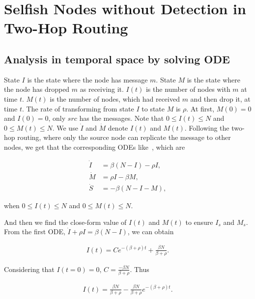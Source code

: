 \section{Selfish Nodes without Detection in Two-Hop Routing}
\label{sec:wo_detect}
\subsection{Analysis in temporal space by solving ODE}
State $I$ is the state where the node has message $m$.
State $M$ is the state where the node has dropped $m$ as receiving it.
$I(t)$ is the number of nodes with $m$ at time $t$.
$M(t)$ is the number of nodes, which had received $m$ and then drop it, at time $t$.
The rate of transforming from state $I$ to state $M$ is $\rho$.
At first, $M(0)=0$ and $I(0)=0$, only $src$ has the messages.
Note that $0 \le I(t) \le N$ and $0 \le M(t) \le N$.
We use $\dot{I}$ and $\dot{M}$ denote $I(t)$ and $M(t)$.
Following the two-hop routing,
where only the source node can replicate the message to other nodes,
we get that the corresponding ODEs like~\cite{CC2007PerfAnaly}, which are
\begin{small}
\begin{equation}
\nonumber
\begin{aligned}
\dot{I} &= \beta (N-I) - \rho I,\\
\dot{M} &= \rho I - \beta M,\\
\dot{S} &= - \beta (N-I-M),
\end{aligned}
\end{equation}
\end{small}
when $0 \le I(t) \le N$ and $0 \le M(t) \le N$.

And then we find the close-form value of $I(t)$ and $M(t)$ to ensure $I_{s}$ and $M_{s}$.
From the first ODE, $\dot{I} + \rho I = \beta (N-I)$, we can obtain
\begin{small}
\begin{equation}
\nonumber
\begin{aligned}
I(t) = C e^{-(\beta + \rho)t} + \frac{ \beta N }{ \beta + \rho }.
\end{aligned}
\end{equation}
\end{small}
Considering that $I(t=0) = 0$, $C = \frac{ -\beta N }{ \beta + \rho }$.
Thus
\begin{small}
\begin{equation}
\nonumber
\begin{aligned}
I(t) = \frac{ \beta N }{ \beta + \rho } - \frac{ \beta N }{ \beta + \rho } e^{-(\beta + \rho)t}.
\end{aligned}
\end{equation}
\end{small}

